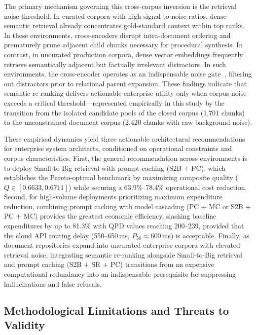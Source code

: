 The primary mechanism governing this cross-corpus inversion is the retrieval noise threshold. In curated corpora with high signal-to-noise ratios, dense semantic retrieval already concentrates gold-standard context within top ranks. In these environments, cross-encoders disrupt intra-document ordering and prematurely prune adjacent child chunks necessary for procedural synthesis. In contrast, in uncurated production corpora, dense vector embeddings frequently retrieve semantically adjacent but factually irrelevant distractors. In such environments, the cross-encoder operates as an indispensable noise gate~\citep{moreira2024enhancing, cheng2026enhancing}, filtering out distractors prior to relational parent expansion. These findings indicate that semantic re-ranking delivers actionable enterprise utility only when corpus noise exceeds a critical threshold---represented empirically in this study by the transition from the isolated candidate pools of the closed corpus (1,701 chunks) to the unconstrained document corpus (2,420 chunks with raw background noise).

These empirical dynamics yield three actionable architectural recommendations for enterprise system architects, conditioned on operational constraints and corpus characteristics. First, the general recommendation across environments is to deploy Small-to-Big retrieval with prompt caching (S2B + PC), which establishes the Pareto-optimal benchmark by maximizing composite quality ($Q \in [0.6633, 0.6711]$) while securing a 63.9\%--78.4\% operational cost reduction. Second, for high-volume deployments prioritizing maximum expenditure reduction, combining prompt caching with model cascading (PC + MC or S2B + PC + MC) provides the greatest economic efficiency, slashing baseline expenditures by up to 81.3\% with QPD values reaching 200--239, provided that the cloud API routing delay (550--650\,ms, $P_{50} \approx 600$\,ms) is acceptable. Finally, as document repositories expand into uncurated enterprise corpora with elevated retrieval noise, integrating semantic re-ranking alongside Small-to-Big retrieval and prompt caching (S2B + SR + PC) transitions from an expensive computational redundancy into an indispensable prerequisite for suppressing hallucinations and false refusals.

\subsection{Methodological Limitations and Threats to Validity}
\label{subsec:disc_limitations}

